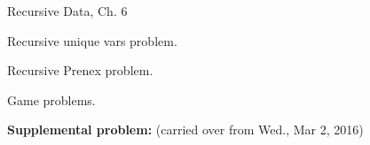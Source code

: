 \documentclass[handout]{mcs}
\begin{document}

\begin{staffnotes}
Recursive Data, Ch. 6
\end{staffnotes}



Recursive unique vars problem.

Recursive Prenex problem.

Game problems.

\textbf{Supplemental problem:} (carried over from Wed., Mar 2, 2016)



\end{document}
